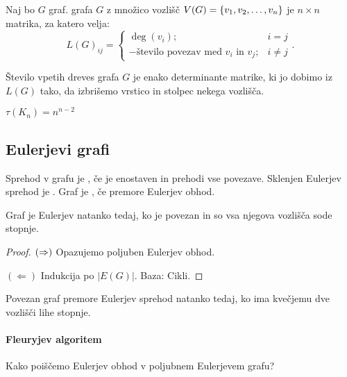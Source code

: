 \begin{definicija}
    Naj bo $G$ graf.  grafa $G$ z množico vozlišč $V(G) = \left\{v_1, v_2, \ldots, v_n\right\}$ je $n \times n$ matrika, za katero velja: $$L(G)_{ij} = \begin{cases}
        \deg(v_i); &i=j \\ - \text{število povezav med $v_i$ in $v_j$}; &i \neq j
    \end{cases}.$$
\end{definicija}

\begin{izrek}
    Število vpetih dreves grafa $G$ je enako determinante matrike, ki jo dobimo iz $L(G)$ tako, da izbrišemo vrstico in stolpec nekega vozlišča.
\end{izrek}

\begin{izrek}[Cayley]
    $\tau(K_n) = n^{n-2}$
\end{izrek}

\subsection{Eulerjevi grafi}
\begin{definicija}
    Sprehod v grafu je , če je enostaven in prehodi vse povezave. Sklenjen Eulerjev sprehod je . Graf je , če premore Eulerjev obhod.
\end{definicija}

\begin{izrek}
    Graf je Eulerjev natanko tedaj, ko je povezan in so vsa njegova vozlišča sode stopnje.
\end{izrek}

\begin{proof}
    $(\Rightarrow)$ Opazujemo poljuben Eulerjev obhod.

    $(\Leftarrow)$ Indukcija po $|E(G)|$. Baza: Cikli.
\end{proof}

\begin{izrek}
    Povezan graf premore Eulerjev sprehod natanko tedaj, ko ima kvečjemu dve vozlišči lihe stopnje.
\end{izrek}

\paragraph{Fleuryjev algoritem} Kako poiščemo Eulerjev obhod v poljubnem Eulerjevem grafu?

